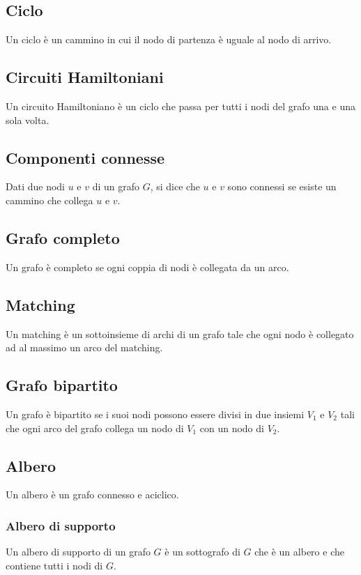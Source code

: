  \subsection{Ciclo}
  Un ciclo \`e un cammino in cui il nodo di partenza \`e uguale al nodo di arrivo.
  

  \subsection{Circuiti Hamiltoniani}

  Un circuito Hamiltoniano \`e un ciclo che passa per tutti i nodi del grafo una e una sola volta.


  \subsection{Componenti connesse}
  Dati due nodi $u$ e $v$ di un grafo $G$, si dice che $u$ e $v$ sono connessi se esiste un cammino che collega $u$ e $v$.



  \subsection{Grafo completo}
  Un grafo \`e completo se ogni coppia di nodi \`e collegata da un arco.



  \subsection{Matching}
  Un matching \`e un sottoinsieme di archi di un grafo tale che ogni nodo \`e collegato ad al massimo un arco del matching.


  \subsection{Grafo bipartito}
  Un grafo \`e bipartito se i suoi nodi possono essere divisi in due insiemi $V_1$ e $V_2$ tali che ogni arco del grafo collega un nodo di $V_1$ con un nodo di $V_2$.




  \subsection{Albero}
  Un albero \`e un grafo connesso e aciclico.

  \subsubsection{Albero di supporto}
  Un albero di supporto di un grafo $G$ \`e un sottografo di $G$ che \`e un albero e che contiene tutti i nodi di $G$.
